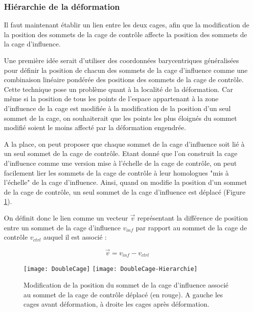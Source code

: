 \subsubsection{Hiérarchie de la déformation}

Il faut maintenant établir un lien entre les deux cages, afin que la
modification de la position des sommets de la cage de contrôle affecte la
position des sommets de la cage d'influence.

Une première idée serait d'utiliser des coordonnées barycentriques
généralisées pour définir la position de chacun des sommets de la cage
d'influence comme une combinaison linéaire pondérée des positions des sommets
de la cage de contrôle. Cette technique pose un problème quant à la localité
de la déformation. Car même si  la position de tous les points de l'espace
appartenant à la zone d'influence de la cage est modifiée à la modification de
la position d'un seul sommet de la cage, on souhaiterait que les points les
plus éloignés du sommet modifié soient le moins affecté par la déformation
engendrée.

A la place, on peut proposer que chaque sommet de la cage d'influence soit lié à
un seul sommet de la cage de contrôle. Etant donné que l'on construit la cage
d'influence comme une version mise à l'échelle de la cage de contrôle, on peut
facilement lier les sommets de la cage de contrôle à leur homologues "mis à
l'échelle" de la cage d'influence. Ainsi, quand on modifie la position d'un
sommet de la cage de contrôle, un seul sommet de la cage d'influence est
déplacé (Figure \ref{MelHie}).

On définit donc le lien comme un vecteur $\overrightarrow{v}$ représentant la
différence de position entre un sommet de la cage d'influence $v_{inf}$ par
rapport au sommet de la cage de contrôle $v_{ctrl}$ auquel il est associé :

\begin{displaymath}
  \overrightarrow{v} = v_{inf}-v_{ctrl}
\end{displaymath}

\begin{figure}[ht]
\begin{center}
  \texttt{[image: DoubleCage]}
  \texttt{[image: DoubleCage-Hierarchie]}

  \caption[Association des cages de contrôle et d'influence] {Modification de
la position du sommet de la cage d'influence associé au sommet de la cage de
contrôle déplacé (en rouge). A gauche les cages avant déformation, à droite
les cages après déformation.}

  \label{MelHie}
\end{center}
\end{figure}

